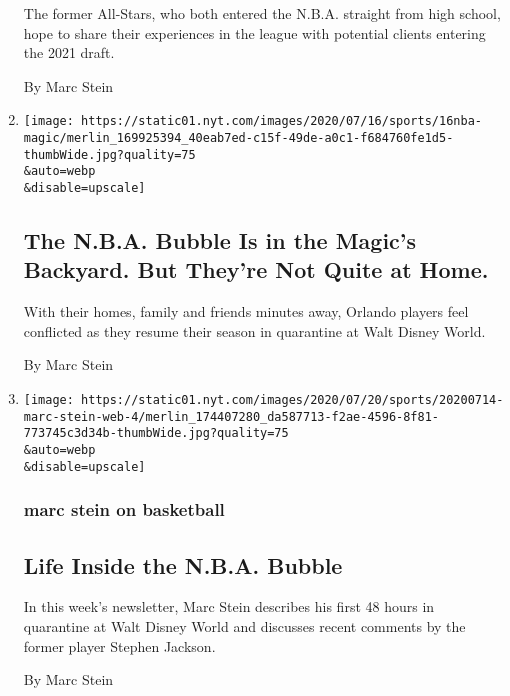 \begin{enumerate}
  The former All-Stars, who both entered the N.B.A. straight from high
  school, hope to share their experiences in the league with potential
  clients entering the 2021 draft.

  By Marc Stein
\item
  \href{/2020/07/17/sports/nba-bubble-orlando-magic.html}{}

  \texttt{[image: https://static01.nyt.com/images/2020/07/16/sports/16nba-magic/merlin\_169925394\_40eab7ed-c15f-49de-a0c1-f684760fe1d5-thumbWide.jpg?quality=75\\\&auto=webp\\\&disable=upscale]}

  \hypertarget{the-nba-bubble-is-in-the-magics-backyard-but-theyre-not-quite-at-home}{%
  \subsection{The N.B.A. Bubble Is in the Magic's Backyard. But They're
  Not Quite at
  Home.}\label{the-nba-bubble-is-in-the-magics-backyard-but-theyre-not-quite-at-home}}

  With their homes, family and friends minutes away, Orlando players
  feel conflicted as they resume their season in quarantine at Walt
  Disney World.

  By Marc Stein
\item
  \href{/2020/07/15/sports/basketball/nba-bubble-orlando-stephen-jackson.html}{}

  \texttt{[image: https://static01.nyt.com/images/2020/07/20/sports/20200714-marc-stein-web-4/merlin\_174407280\_da587713-f2ae-4596-8f81-773745c3d34b-thumbWide.jpg?quality=75\\\&auto=webp\\\&disable=upscale]}

  \hypertarget{marc-stein-on-basketball-2}{%
  \subsubsection{marc stein on
  basketball}\label{marc-stein-on-basketball-2}}

  \hypertarget{life-inside-the-nba-bubble-1}{%
  \subsection{Life Inside the N.B.A.
  Bubble}\label{life-inside-the-nba-bubble-1}}

  In this week's newsletter, Marc Stein describes his first 48 hours in
  quarantine at Walt Disney World and discusses recent comments by the
  former player Stephen Jackson.

  By Marc Stein
\end{enumerate}

